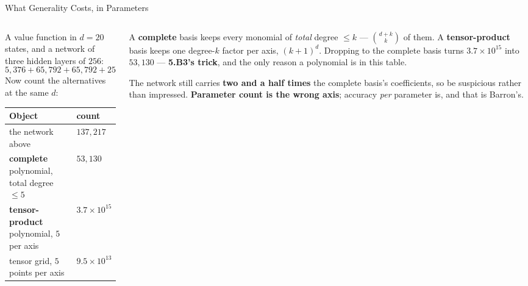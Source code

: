 \begin{frame}{What Generality Costs, in Parameters}
\begin{columns}[T]
\begin{column}{0.52\textwidth}
\small
A value function in $d=20$ states, and a network of three hidden layers of $256$:
\[
  5{,}376+65{,}792+65{,}792+257=\mathbf{137{,}217}.
\]
Now count the alternatives at the same $d$:

\begin{center}\footnotesize
\begin{tabularx}{\linewidth}{@{}>{\raggedright\arraybackslash}X >{\raggedleft\arraybackslash}p{2.1cm}@{}}
\toprule
\textbf{Object} & \textbf{count} \\
\midrule
the network above & $137{,}217$ \\
\textbf{complete} polynomial, total degree $\le5$ & $53{,}130$ \\
\textbf{tensor-product} polynomial, $5$ per axis & $3.7\times10^{15}$ \\
tensor grid, $5$ points per axis & $9.5\times10^{13}$ \\
\bottomrule
\end{tabularx}
\end{center}
\end{column}
\begin{column}{0.45\textwidth}
\begin{conceptbox}[title=\textbf{Read rows two and three together}]\small
A \textbf{complete} basis keeps every monomial of \emph{total} degree $\le k$ --- $\binom{d+k}{k}$ of them. A \textbf{tensor-product} basis keeps one degree-$k$ factor per axis, $(k+1)^{d}$.
\medskip
Dropping to the complete basis turns $3.7\times10^{15}$ into $53{,}130$ --- \textbf{5.B3's trick}, and the only reason a polynomial is in this table.
\end{conceptbox}
\smallskip
{\footnotesize The network still carries \textbf{two and a half times} the complete basis's coefficients, so be suspicious rather than impressed. \textbf{Parameter count is the wrong axis}; accuracy \emph{per} parameter is, and that is Barron's.}
\end{column}
\end{columns}
\vspace{1mm}
\end{frame}

